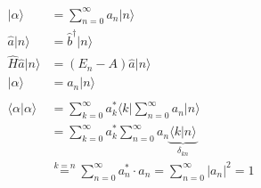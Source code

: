     \begin{align*}
        \vert \alpha \rangle &= \sum_{n=0}^{\infty} a_n \vert n \rangle\\
        \hat{a} \vert n \rangle &= \hat{b}^{\dagger} \vert n \rangle\\
        \hat{H}\hat{a} \vert n \rangle &= (E_n-A) \hat{a} \vert n \rangle\\
        \vert \alpha \rangle &= a_n \vert n \rangle\\
        \\
        \langle \alpha \vert \alpha \rangle &= \sum_{k=0}^{\infty} a_k^* \langle k \vert \sum_{n=0}^{\infty} a_n \vert n \rangle\\
        &= \sum_{k=0}^{\infty} a_k^* \sum_{n=0}^{\infty} a_n \underbrace{\langle k \vert n \rangle}_{\delta_{kn}}\\
        &\stackrel{k=n}{=} \sum_{n=0}^{\infty} a_n^* \cdot a_n = \sum_{n=0}^{\infty} \vert a_n \vert^2 = 1\\
    \end{align*}

